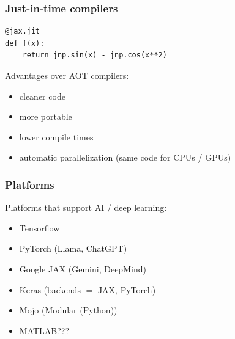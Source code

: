 \begin{frame}[fragile]
    \frametitle{Just-in-time compilers}

    \vspace{0.5em}
    
    \begin{verbatim}
@jax.jit
def f(x):
    return jnp.sin(x) - jnp.cos(x**2)
    \end{verbatim}

    \vspace{0.5em}
    \vspace{0.5em}
    Advantages over AOT compilers:

    \begin{itemize}
        \item cleaner code
    \vspace{0.5em}
        \item more portable
    \vspace{0.5em}
        \item lower compile times
    \vspace{0.5em}
        \item automatic parallelization (same code for CPUs / GPUs)
    \end{itemize}

\end{frame}



\begin{frame}
    \frametitle{Platforms}
    
    Platforms that support AI / deep learning:

    \vspace{0.5em}
    \begin{itemize}
        \item Tensorflow
        \vspace{0.5em}
        \item PyTorch (Llama, ChatGPT)
        \vspace{0.5em}
        \item Google JAX (Gemini, DeepMind)
        \vspace{0.5em}
        \item Keras (backends $=$ JAX, PyTorch)
        \vspace{0.5em}
        \item Mojo (Modular (Python))
        \vspace{0.5em}
        \item MATLAB???
    \end{itemize}

\end{frame}




